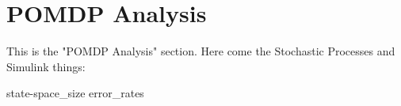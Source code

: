 \section{POMDP Analysis}

This is the "POMDP Analysis" section. Here come the Stochastic Processes and Simulink things:

{state-space_size}
{error_rates}
